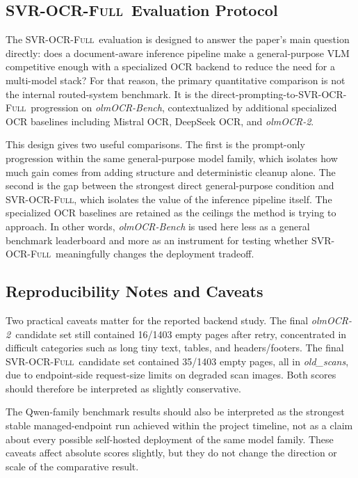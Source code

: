 \documentclass[conference]{IEEEtran}
\newcommand{\papername}[1]{\textit{#1}}
\newcommand{\svrocr}{\textsc{SVR-OCR-Full}}
\newcommand{\olmocr}{\papername{olmOCR-2}}
\begin{document}
\subsection{\svrocr\ Evaluation Protocol}

The \svrocr\ evaluation is designed to answer the paper's main question directly: does a document-aware inference pipeline make a general-purpose VLM competitive enough with a specialized OCR backend to reduce the need for a multi-model stack? For that reason, the primary quantitative comparison is not the internal routed-system benchmark. It is the direct-prompting-to-\svrocr\ progression on \papername{olmOCR-Bench}, contextualized by additional specialized OCR baselines including Mistral OCR, DeepSeek OCR, and \olmocr.

This design gives two useful comparisons. The first is the prompt-only progression within the same general-purpose model family, which isolates how much gain comes from adding structure and deterministic cleanup alone. The second is the gap between the strongest direct general-purpose condition and \svrocr, which isolates the value of the inference pipeline itself. The specialized OCR baselines are retained as the ceilings the method is trying to approach. In other words, \papername{olmOCR-Bench} is used here less as a general benchmark leaderboard and more as an instrument for testing whether \svrocr\ meaningfully changes the deployment tradeoff.

\subsection{Reproducibility Notes and Caveats}

Two practical caveats matter for the reported backend study. The final \olmocr\ candidate set still contained 16/1403 empty pages after retry, concentrated in difficult categories such as long tiny text, tables, and headers/footers. The final \svrocr\ candidate set contained 35/1403 empty pages, all in \papername{old\_scans}, due to endpoint-side request-size limits on degraded scan images. Both scores should therefore be interpreted as slightly conservative.

The Qwen-family benchmark results should also be interpreted as the strongest stable managed-endpoint run achieved within the project timeline, not as a claim about every possible self-hosted deployment of the same model family. These caveats affect absolute scores slightly, but they do not change the direction or scale of the comparative result.
\end{document}
